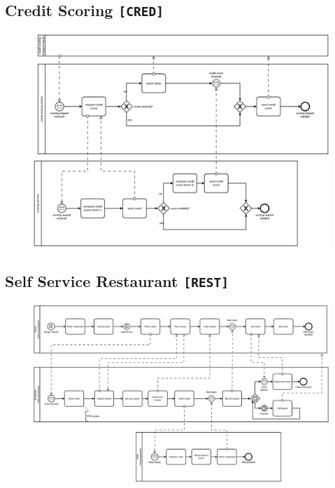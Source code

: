 \clearpage

\begin{landscape}
\thispagestyle{empty}

\section*{Credit Scoring \texttt{[CRED]} }
\begin{figure}[!h]
    \centering
    \includegraphics[width=1.3\textwidth]{figures/benchmark/Credit-scoring.png}
\end{figure}
\end{landscape}

\clearpage

\begin{landscape}
\thispagestyle{empty}
\section*{Self Service Restaurant \texttt{[REST]}}

\begin{figure}[!h]
    \centering
    \includegraphics[width=1.3\textwidth]{figures/benchmark/Self-service-restaurant.png}
\end{figure}
\end{landscape}

